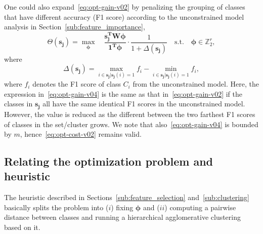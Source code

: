 One could also expand~\eqref{eq:opt-gain-v02} by penalizing the grouping of classes that have different accuracy (\ie F1 score) according to the unconstrained model analysis in Section~\ref{sub:feature_importance}, \eg
\begin{equation}
    \Theta(\pmb{s_j}) = \max_{\pmb{\phi}} \quad \frac{\pmb{s_j^TW\phi}}{\pmb{1^T\phi}} \cdot \frac{1}{1+\Delta(\pmb{s_j})} \quad \text{s.t.} \quad \pmb{\phi} \in \mathbb{Z}_2^r,
    \label{eq:opt-gain-v04}
\end{equation}
where
\begin{equation}
    \Delta(\pmb{s_j}) = \max_{i\in\pmb{s_j}|\pmb{s_j}(i)=1} f_i - \min_{i\in\pmb{s_j}|\pmb{s_j}(i)=1} f_i,
\end{equation}
where $f_i$ denotes the F1 score of class $C_i$ from the unconstrained model.
Here, the expression in~\eqref{eq:opt-gain-v04} is the same as that in~\eqref{eq:opt-gain-v02} if the classes in $\pmb{s_j}$ all have the same identical F1 scores in the unconstrained model. However, the value is reduced as the different between the two farthest F1 scores of classes in the set/cluster grows. We note that also~\eqref{eq:opt-gain-v04} is bounded by $m$, hence~\eqref{eq:opt-cost-v02} remains valid.

\subsection{Relating the optimization problem and heuristic}

The heuristic described in Sections~\ref{sub:feature_selection} and~\ref{sub:clustering} basically splits the problem into ($i$) fixing $\pmb{\phi}$ and ($ii$) computing a pairwise distance between classes and running a hierarchical agglomerative clustering based on it.

